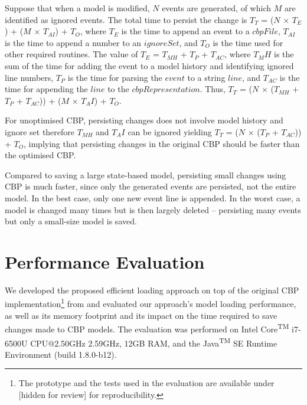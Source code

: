 \documentclass{llncs}
\begin{document}
    Suppose that when a model is modified,  $N$ events are generated, of which $M$ are identified as ignored events. The total time to persist the change is $T_T$ = ($N$ $\times$ $T_E$) + ($M$ $\times$ $T_{AI}$) + $T_O$, where $T_E$ is the time to append an event to a $cbpFile$, $T_{AI}$ is the time to append a number to an $ignoreSet$, and $T_O$ is the time used for other required routines. The value of $T_E$ = $T_{MH}$ + $T_P$ + $T_{AC}$, where $T_MH$ is the sum of the time for adding the event to a model history and identifying ignored line numbers, $T_P$ is the time for parsing the $event$ to a string $line$, and $T_{AC}$ is the time for appending the $line$ to the $cbpRepresentation$. Thus, $T_T$ = ($N$ $\times$ ($T_{MH}$ + $T_P$ + $T_{AC}$))  + ($M$ $\times$ $T_AI$) + $T_O$. 
    
    For unoptimised CBP, persisting changes does not involve model history and ignore set therefore $T_{MH}$ and $T_AI$ can be ignored yielding $T_T$ = ($N$ $\times$ ($T_P$ + $T_{AC}$)) + $T_O$, implying that persisting changes in the original CBP should be faster than the optimised CBP. 
    
    Compared to saving a large state-based model, persisting small changes using CBP is much faster, since only the generated events  are persisted, not the entire model. In the best case, only one new event line is appended. In the worst case, a model is changed many times but is then largely deleted -- persisting many events but only a small-size model is saved. 
    
    
    \section{Performance Evaluation}
    \label{sec:performance_evaluation}
    
    We developed the proposed efficient loading approach on top of the original CBP implementation\footnote{The prototype and the tests used in the evaluation are available under [hidden for review] for reproducibility. %
    } from \cite{yohannis2017turning} and evaluated our approach's model loading performance, as well as its memory footprint and its impact on the time required to save changes made to CBP models. The evaluation was performed on Intel\textsuperscript{\textregistered} Core\textsuperscript{TM} i7-6500U CPU@2.50GHz 2.59GHz, 12GB RAM, and the Java\textsuperscript{TM} SE Runtime Environment (build 1.8.0-b12).
    
\end{document}
